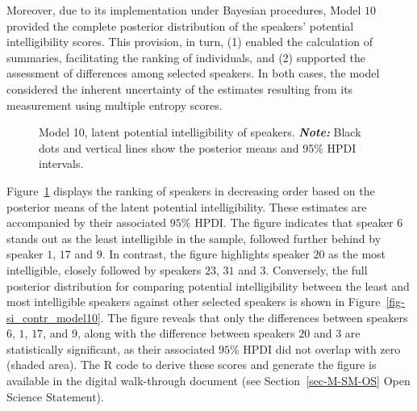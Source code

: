\documentclass[
  authoryear,
  preprint,
  1p]{elsarticle}
\begin{document}
Moreover, due to its implementation under Bayesian procedures, Model
\(10\) provided the complete posterior distribution of the speakers'
potential intelligibility scores. This provision, in turn, (1) enabled
the calculation of summaries, facilitating the ranking of individuals,
and (2) supported the assessment of differences among selected speakers.
In both cases, the model considered the inherent uncertainty of the
estimates resulting from its measurement using multiple entropy scores.

\label{cell-fig-rq2-si-model10}
\begin{figure}[H]


\caption{\label{fig-rq2-si-model10}Model 10, latent potential
intelligibility of speakers. \textbf{\emph{Note:}} Black dots and
vertical lines show the posterior means and 95\% HPDI intervals.}

\end{figure}%

Figure~\ref{fig-rq2-si-model10} displays the ranking of speakers in
decreasing order based on the posterior means of the latent potential
intelligibility. These estimates are accompanied by their associated
\(95\%\) HPDI. The figure indicates that speaker \(6\) stands out as the
least intelligible in the sample, followed further behind by speaker
\(1\), \(17\) and \(9\). In contrast, the figure highlights speaker
\(20\) as the most intelligible, closely followed by speakers \(23\),
\(31\) and \(3\). Conversely, the full posterior distribution for
comparing potential intelligibility between the least and most
intelligible speakers against other selected speakers is shown in
Figure~\ref{fig-si_contr_model10}. The figure reveals that only the
differences between speakers \(6\), \(1\), \(17\), and \(9\), along with
the difference between speakers \(20\) and \(3\) are statistically
significant, as their associated \(95\%\) HPDI did not overlap with zero
(shaded area). The R code to derive these scores and generate the figure
is available in the digital walk-through document (see
Section~\ref{sec-M-SM-OS} Open Science Statement).
\end{document}
